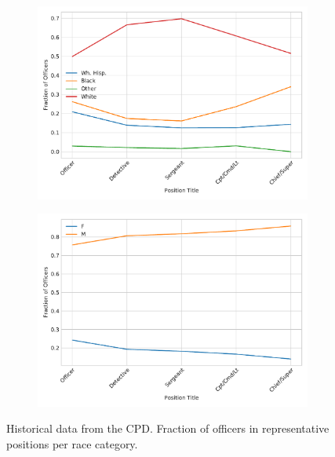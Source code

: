 \begin{figure}[h] 
\begin{subfigure}{0.45\textwidth}
\includegraphics[width=\textwidth]{figs/position_race} 
\end{subfigure}
\begin{subfigure}{0.45\textwidth}
\includegraphics[width=\textwidth]{figs/position_gender} 
\end{subfigure}
\caption{Historical data from the CPD. Fraction of officers in representative positions 
per race category.} \label{fig:salary}
\end{figure}



